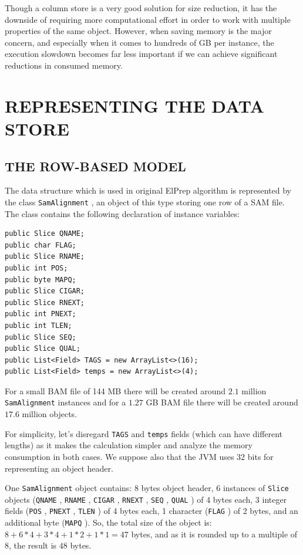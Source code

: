\documentclass[a4paper,twoside]{article}
\begin{document}
Though a column store is a very good solution for size reduction, it has the downside of requiring more computational effort in order to work with multiple properties of the same object.
However, when saving memory is the major concern, and especially when it comes to hundreds of GB per instance, the execution slowdown becomes far less important if we can achieve significant reductions in consumed memory.



\section{\uppercase{Representing the Data Store}}\label{sec:uppercase4}

\subsection{\uppercase{The Row-Based Model}}\label{subsec:uppercase11}

The data structure which is used in original ElPrep algorithm is represented by the class {\texttt{SamAlignment} }, an object of this type storing one row of a SAM file.
The class contains the following declaration of instance variables:

\begin{small}
\begin{verbatim}
public Slice QNAME;
public char FLAG;
public Slice RNAME;
public int POS;
public byte MAPQ;
public Slice CIGAR;
public Slice RNEXT;
public int PNEXT;
public int TLEN;
public Slice SEQ;
public Slice QUAL;
public List<Field> TAGS = new ArrayList<>(16);
public List<Field> temps = new ArrayList<>(4);
\end{verbatim}
\end{small}

For a small BAM file of 144 MB there will be created around $2.1$ million {\texttt{SamAlignment} } instances and for a $1.27$ GB BAM file there will be created around $17.6$ million objects.

For simplicity, let's disregard {\texttt{TAGS} } and {\texttt{temps} } fields (which can have different lengths) as it makes the calculation simpler and analyze the memory consumption in both cases.
We suppose also that the JVM uses 32 bits for representing an object header.

One {\texttt{SamAlignment} } object contains:
8 bytes object header, 6 instances of {\texttt{Slice} } objects ({\texttt{QNAME} }, {\texttt{RNAME} }, {\texttt{CIGAR} }, {\texttt{RNEXT} }, {\texttt{SEQ} }, {\texttt{QUAL} }) of 4 bytes each, 3 integer fields ({\texttt{POS} }, {\texttt{PNEXT} }, {\texttt{TLEN} }) of 4 bytes each, 1 character ({\texttt{FLAG} }) of 2 bytes, and an additional byte ({\texttt{MAPQ} }).
So, the total size of the object is: $8 + 6 * 4 + 3*4  + 1 * 2+ 1 * 1 = 47$ bytes, and as it is rounded up to a multiple of $8$, the result is $48$ bytes.
\end{document}
